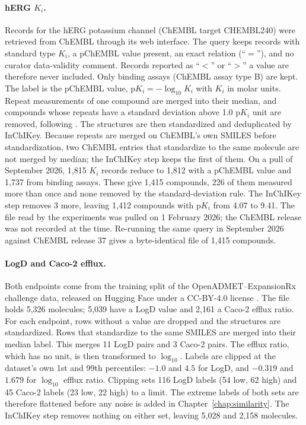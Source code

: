 \paragraph{\texorpdfstring{hERG $K_i$.}{hERG Ki.}} Records for the hERG potassium channel (ChEMBL target CHEMBL240) were retrieved from ChEMBL \citep{Zdrazil2023} through its web interface. The query keeps records with standard type $K_i$, a pChEMBL value present, an exact relation (``$=$''), and no curator data-validity comment. Records reported as ``$<$'' or ``$>$'' a value are therefore never included. Only binding assays (ChEMBL assay type B) are kept. The label is the pChEMBL value, $\mathrm{p}K_i = -\log_{10} K_i$ with $K_i$ in molar units. Repeat measurements of one compound are merged into their median, and compounds whose repeats have a standard deviation above 1.0 p$K_i$ unit are removed, following \citet{landrum2024}. The structures are then standardized and deduplicated by InChIKey. Because repeats are merged on ChEMBL's own SMILES before standardization, two ChEMBL entries that standardize to the same molecule are not merged by median; the InChIKey step keeps the first of them. On a pull of September 2026, 1,815 $K_i$ records reduce to 1,812 with a pChEMBL value and 1,737 from binding assays. These give 1,415 compounds, 226 of them measured more than once and none removed by the standard-deviation rule. The InChIKey step removes 3 more, leaving 1,412 compounds with p$K_i$ from 4.07 to 9.41. The file read by the experiments was pulled on 1 February 2026; the ChEMBL release was not recorded at the time. Re-running the same query in September 2026 against ChEMBL release 37 gives a byte-identical file of 1,415 compounds.

\paragraph{LogD and Caco-2 efflux.} Both endpoints come from the training split of the OpenADMET--ExpansionRx challenge data, released on Hugging Face under a CC-BY-4.0 license \citep{openadmet}. The file holds 5,326 molecules; 5,039 have a LogD value and 2,161 a Caco-2 efflux ratio. For each endpoint, rows without a value are dropped and the structures are standardized. Rows that standardize to the same SMILES are merged into their median label. This merges 11 LogD pairs and 3 Caco-2 pairs. The efflux ratio, which has no unit, is then transformed to $\log_{10}$. Labels are clipped at the dataset's own 1st and 99th percentiles: $-1.0$ and $4.5$ for LogD, and $-0.319$ and $1.679$ for $\log_{10}$ efflux ratio. Clipping sets 116 LogD labels (54 low, 62 high) and 45 Caco-2 labels (23 low, 22 high) to a limit. The extreme labels of both sets are therefore flattened before any noise is added in Chapter~\ref{chap:similarity}. The InChIKey step removes nothing on either set, leaving 5,028 and 2,158 molecules.

